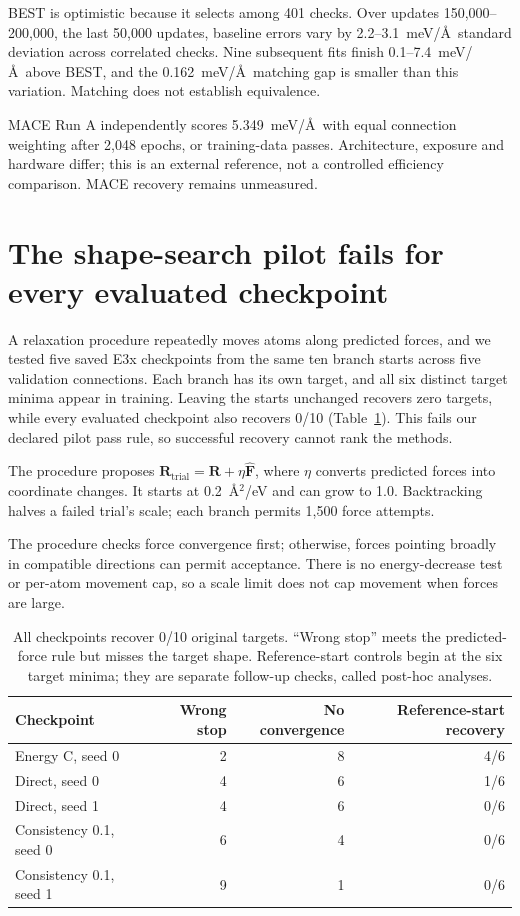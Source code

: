 \documentclass{article}
\begin{document}
BEST is optimistic because it selects among 401 checks. Over updates 150,000--200,000, the last 50,000 updates, baseline errors vary by 2.2--3.1~meV/\AA\ standard deviation across correlated checks. Nine subsequent fits finish 0.1--7.4~meV/\AA\ above BEST, and the 0.162~meV/\AA\ matching gap is smaller than this variation. Matching does not establish equivalence.

MACE Run A independently scores 5.349~meV/\AA\ with equal connection weighting after 2,048 epochs, or training-data passes. Architecture, exposure and hardware differ; this is an external reference, not a controlled efficiency comparison. MACE recovery remains unmeasured.

\section{The shape-search pilot fails for every evaluated checkpoint}
A relaxation procedure repeatedly moves atoms along predicted forces, and we tested five saved E3x checkpoints from the same ten branch starts across five validation connections. Each branch has its own target, and all six distinct target minima appear in training. Leaving the starts unchanged recovers zero targets, while every evaluated checkpoint also recovers 0/10 (Table~\ref{tab:recovery}). This fails our declared pilot pass rule, so successful recovery cannot rank the methods.

The procedure proposes $\mathbf R_{\mathrm{trial}}=\mathbf R+\eta\widehat{\mathbf F}$, where $\eta$ converts predicted forces into coordinate changes. It starts at 0.2~\AA$^2$/eV and can grow to 1.0. Backtracking halves a failed trial's scale; each branch permits 1,500 force attempts.

The procedure checks force convergence first; otherwise, forces pointing broadly in compatible directions can permit acceptance. There is no energy-decrease test or per-atom movement cap, so a scale limit does not cap movement when forces are large.

\begin{table}[htbp]
\centering\small
\caption{All checkpoints recover 0/10 original targets. ``Wrong stop'' meets the predicted-force rule but misses the target shape. Reference-start controls begin at the six target minima; they are separate follow-up checks, called post-hoc analyses.}\label{tab:recovery}
\begin{tabular}{lrrr}\toprule
Checkpoint & Wrong stop & No convergence & Reference-start recovery\\\midrule
Energy C, seed 0 & 2 & 8 & 4/6\\
Direct, seed 0 & 4 & 6 & 1/6\\
Direct, seed 1 & 4 & 6 & 0/6\\
Consistency 0.1, seed 0 & 6 & 4 & 0/6\\
Consistency 0.1, seed 1 & 9 & 1 & 0/6\\\bottomrule
\end{tabular}
\end{table}
\end{document}
